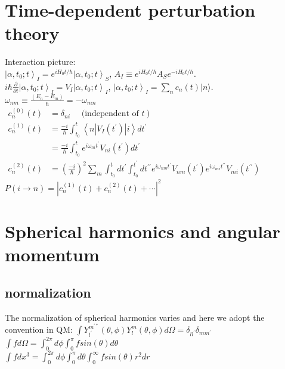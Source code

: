 \documentclass[10pt, oneside]{article}   	%
\begin{document}
\begin{multicols}{2}
\section{Time-dependent perturbation theory}
Interaction picture:\\
$\left|\alpha, t_{0} ; t\right\rangle_{I}=e^{i H_{0} t / \hbar}\left|\alpha, t_{0} ; t\right\rangle_{S}$,
$A_{I} \equiv e^{i H_{0} t / \hbar} A_{S} e^{-i H_{0} t / \hbar}$.\\
$i \hbar \frac{\partial}{\partial t}\left|\alpha, t_{0} ; t\right\rangle_{I}=V_{I}\left|\alpha, t_{0} ; t\right\rangle_{I}$,
$\left|\alpha, t_{0} ; t\right\rangle_{I}=\sum_{n} c_{n}(t)|n\rangle$.\\
$\omega_{n m} \equiv \frac{\left(E_{n}-E_{m}\right)}{\hbar}=-\omega_{m n}$\\
$\begin{aligned} c_{n}^{(0)}(t) &\left.=\delta_{n i} \quad \text { (independent of } t\right) \\ c_{n}^{(1)}(t) &=\frac{-i}{\hbar} \int_{t_{0}}^{t}\left\langle n\left|V_{I}\left(t^{\prime}\right)\right| i\right\rangle d t^{\prime} \\ &=\frac{-i}{\hbar} \int_{t_{0}}^{t} e^{i \omega_{n i} t^{\prime}} V_{n i}\left(t^{\prime}\right) d t^{\prime} \\ c_{n}^{(2)}(t) &=\left(\frac{-i}{\hbar}\right)^{2} \sum_{m} \int_{t_{0}}^{t} d t^{\prime} \int_{t_{0}}^{t^{\prime}} d t^{\prime \prime} e^{i \omega_{n m} t^{\prime}} V_{n m}\left(t^{\prime}\right) e^{i \omega_{m i} t^{\prime \prime}} V_{m i}\left(t^{\prime \prime}\right) \end{aligned}$\\
$P(i \rightarrow n)=\left|c_{n}^{(1)}(t)+c_{n}^{(2)}(t)+\cdots\right|^{2}$

\section{Spherical harmonics and angular momentum}
\subsection{normalization}
The normalization of spherical harmonics varies and here we adopt the convention in QM:
$\int Y_{l^{\prime}}^{m^{\prime *}}(\theta, \phi) Y_{l}^{m}(\theta, \phi) d \Omega=\delta_{l l^{\prime}} \delta_{m m^{\prime}}$\\
$\int f d\Omega=\int_0^{2\pi}d \phi\int_0^{\pi} f sin(\theta) d \theta$\\
$\int f d x^3=\int_0^{2\pi}d \phi\int_0^{\pi} d\theta \int_0^{\infty} f sin(\theta) r^2 d r$

\end{multicols}
\end{document}
